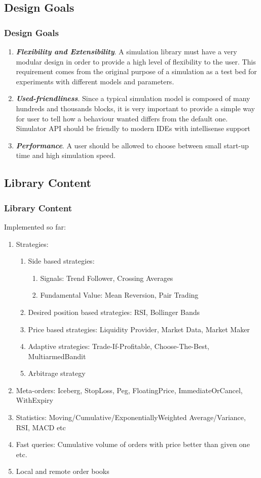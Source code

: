 \documentclass{beamer}
\begin{document}
\subsection{Design Goals}
\begin{frame}
\frametitle{Design Goals}
\begin{enumerate}
  \item \textbf{\textit{Flexibility and Extensibility}}. A simulation library must have a very modular design in order to provide a high level of flexibility to the user. This requirement comes from the original purpose of a simulation as a test bed for experiments with different models and parameters.
  \item \textbf{\textit{Used-friendliness}}. Since a typical simulation model is composed of many hundreds and thousands blocks, it is very important to provide a simple way for user to tell how a behaviour wanted differs from the default one. Simulator API should be friendly to modern IDEs with intellisense support
  \item \textbf{\textit{Performance}}. A user should be allowed to choose between small start-up time and high simulation speed.
\end{enumerate}
\end{frame}
\subsection{Library Content}
\begin{frame}
\frametitle{Library Content}
Implemented so far:
\begin{enumerate}
  \item Strategies: 
  \begin{enumerate}
    \item Side based strategies:
    \begin{enumerate}
        \item Signals: Trend Follower, Crossing Averages
        \item Fundamental Value: Mean Reversion, Pair Trading
    \end{enumerate}    
    \item Desired position based strategies: RSI, Bollinger Bands
    \item Price based strategies: Liquidity Provider, Market Data, Market Maker
    \item Adaptive strategies: Trade-If-Profitable, Choose-The-Best, MultiarmedBandit
    \item Arbitrage strategy
  \end{enumerate}
  \item Meta-orders: Iceberg, StopLoss, Peg, FloatingPrice, ImmediateOrCancel, WithExpiry
  \item Statistics: Moving/Cumulative/ExponentiallyWeighted Average/Variance, RSI, MACD etc
  \item Fast queries: Cumulative volume of orders with price better than given one etc.
  \item Local and remote order books
\end{enumerate}
\end{frame}
\end{document}
